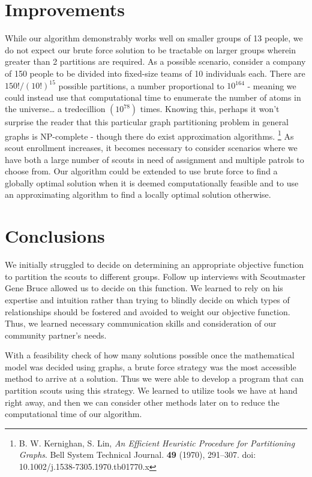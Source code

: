\documentclass{amsart}
\theoremstyle{definition}
\theoremstyle{remark}
\numberwithin{equation}{section}
\begin{document}
\section*{Improvements}
While our algorithm demonstrably works well on smaller groups of 13 people, we do not expect our brute force solution to be tractable on larger groups wherein greater than 2 partitions are required. As a possible scenario, consider a company of 150 people to be divided into fixed-size teams of 10 individuals each. There are $150! / (10!)^{15}$ possible partitions, a number proportional to $10^164$ - meaning we could instead use that computational time to enumerate the number of atoms in the universe… a tredecillion $(10^{78})$ times. Knowing this, perhaps it won’t surprise the reader that this particular graph partitioning problem in general graphs is NP-complete - though there do exist approximation algorithms.%
\footnote{B. W. Kernighan, S. Lin, \textit{An Efficient Heuristic Procedure for Partitioning Graphs}. Bell System Technical Journal. \textbf{49} (1970), 291--307. doi: 10.1002/j.1538-7305.1970.tb01770.x}%
As scout enrollment increases, it becomes necessary to consider scenarios where we have both a large number of scouts in need of assignment and multiple patrols to choose from. Our algorithm could be extended to use brute force to find a globally optimal solution when it is deemed computationally feasible and to use an approximating algorithm to find a locally optimal solution otherwise. 

\section*{Conclusions}
We initially struggled to decide on determining an appropriate objective function to partition the scouts to different groups. Follow up interviews with Scoutmaster Gene Bruce allowed us to decide on this function. We learned to rely on his expertise and intuition rather than trying to blindly decide on which types of relationships should be fostered and avoided to weight our objective function. Thus, we learned necessary communication skills and consideration of our community partner's needs.

With a feasibility check of how many solutions possible once the mathematical model was decided using graphs, a brute force strategy was the most accessible method to arrive at a solution. Thus we were able to develop a program that can partition scouts using this strategy. We learned to utilize tools we have at hand right away, and then we can consider other methods later on to reduce the computational time of our algorithm.
\end{document}
